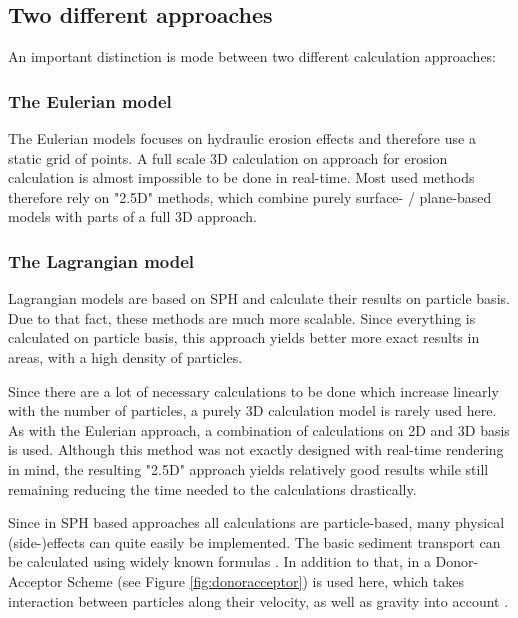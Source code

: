 \subsection{Two different approaches}
An important distinction is mode between two different calculation approaches:

\subsubsection{The Eulerian model}
The Eulerian models focuses on hydraulic erosion effects and therefore use a static grid of points. A full scale 3D calculation on approach for erosion calculation is almost impossible to be done in real-time. Most used methods therefore rely on "2.5D" methods, which combine purely surface- / plane-based models with parts of a full 3D approach.

\subsubsection{The Lagrangian model}
Lagrangian models are based on SPH and calculate their results on particle basis. Due to that fact, these methods are much more scalable. Since everything is calculated on particle basis, this approach yields better more exact results in areas, with a high density of particles.

Since there are a lot of necessary calculations to be done which increase linearly with the number of particles, a purely 3D calculation model is rarely used here. As with the Eulerian approach, a combination of calculations on 2D and 3D basis is used. Although this method was not exactly designed with real-time rendering in mind, the resulting "2.5D" approach yields relatively good results while still remaining reducing the time needed to the calculations drastically.

Since in SPH based approaches all calculations are particle-based, many physical (side-)effects can quite easily be implemented. The basic sediment transport can be calculated using widely known formulas \cite{krivstof2009hydraulic}. In addition to that, in a Donor-Acceptor Scheme (see Figure \ref{fig:donoracceptor}) is used here, which takes interaction between particles along their velocity, as well as gravity into account \cite{krivstof2009hydraulic}.

